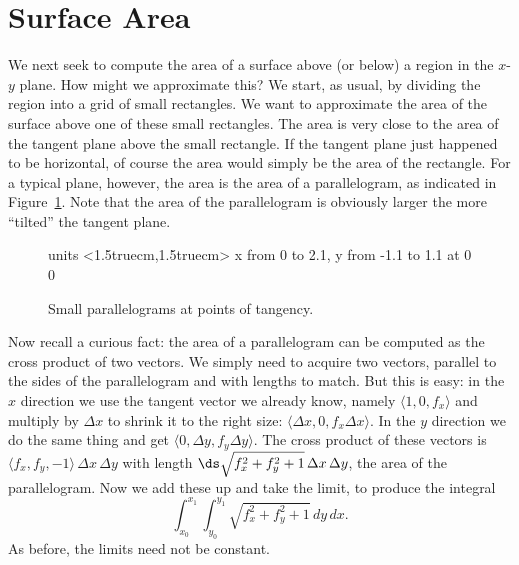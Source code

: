 \section{Surface Area}\label{sec:surfacearea3D}

We next seek to compute the area of a surface above (or below) a
region in the $x$-$y$ plane. How might we approximate this? We start,
as usual, by dividing the region into a grid of small rectangles. We
want to approximate the area of the surface above one of these small
rectangles. The area is very close to the area of the tangent plane
above the small rectangle. If the tangent plane just happened to be
horizontal, of course the area would simply be the area of the
rectangle. For a typical plane, however, the area is the area of a
parallelogram, as indicated in Figure~\ref{fig:smallparallelogram}.
Note that the area of the parallelogram is obviously larger the more
``tilted'' the tangent plane.

\begin{figure}[H]
\centerline{
\vbox{\beginpicture
\normalgraphs
\setcoordinatesystem units <1.5truecm,1.5truecm>
\setplotarea x from 0 to 2.1, y from -1.1 to 1.1
 at 0 0
\endpicture}}
\caption{Small parallelograms at points of tangency.}
\label{fig:smallparallelogram}
\end{figure}

Now recall a curious fact: the area of a
parallelogram can be computed as the cross
product of two vectors. %
We simply need to acquire two vectors, parallel to the sides of the
parallelogram and with lengths to match. But this is easy: in the $x$
direction we use the tangent vector we already know, namely $\langle
1,0,f_x\rangle$ and multiply by $\Delta x$ to shrink it to the right
size: $\langle \Delta x,0,f_x\Delta x\rangle$. In the $y$ direction we
do the same thing and get $\langle 0,\Delta y,f_y\Delta y\rangle$. The
cross product of these vectors is $\langle f_x,f_y,-1\rangle\,\Delta
x\,\Delta y$ with length $\ds\sqrt{f_x^2+f_y^2+1}\,\Delta x\,\Delta
y$, the area of the parallelogram. Now we add these up and take the
limit, to produce the integral
\[\int_{x_0}^{x_1}\int_{y_0}^{y_1} \sqrt{f_x^2+f_y^2+1}\,dy\,dx.\]
As before, the limits need not be constant.


